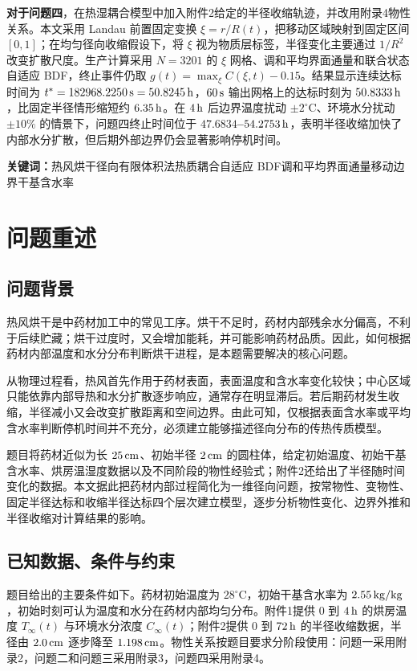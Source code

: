 \documentclass[UTF8,a4paper,12pt]{ctexart}
\numberwithin{equation}{section}
\begin{document}
\textbf{对于问题四}，在热湿耦合模型中加入附件2给定的半径收缩轨迹，并改用附录4物性关系。本文采用 Landau 前置固定变换 $\xi=r/R(t)$，把移动区域映射到固定区间 $[0,1]$；在均匀径向收缩假设下，将 $\xi$ 视为物质层标签，半径变化主要通过 $1/R^2$ 改变扩散尺度。生产计算采用 $N=3201$ 的 $\xi$ 网格、调和平均界面通量和联合状态自适应 BDF，终止事件仍取 $g(t)=\max_\xi C(\xi,t)-0.15$。结果显示连续达标时间为 \textbf{$t^*=182968.2250\rm\,s=50.8245\rm\,h$}，$60\rm\,s$ 输出网格上的达标时刻为 \textbf{$50.8333\rm\,h$}，比固定半径情形缩短约 $6.35\rm\,h$。在 $4\rm\,h$ 后边界温度扰动 $\pm2^\circ\mathrm C$、环境水分扰动 $\pm10\%$ 的情景下，问题四终止时间位于 \textbf{$47.6834$--$54.2753\rm\,h$}，表明半径收缩加快了内部水分扩散，但后期外部边界仍会显著影响停机时间。

\noindent \textbf{关键词：}热风烘干\quad 径向有限体积法\quad 热质耦合\quad 自适应 BDF\quad 调和平均界面通量\quad 移动边界\quad 干基含水率

\section{问题重述}
\subsection{问题背景}
热风烘干是中药材加工中的常见工序。烘干不足时，药材内部残余水分偏高，不利于后续贮藏；烘干过度时，又会增加能耗，并可能影响药材品质。因此，如何根据药材内部温度和水分分布判断烘干进程，是本题需要解决的核心问题。

从物理过程看，热风首先作用于药材表面，表面温度和含水率变化较快；中心区域只能依靠内部导热和水分扩散逐步响应，通常存在明显滞后。若后期药材发生收缩，半径减小又会改变扩散距离和空间边界。由此可知，仅根据表面含水率或平均含水率判断停机时间并不充分，必须建立能够描述径向分布的传热传质模型。

题目将药材近似为长 $25\rm\,cm$、初始半径 $2\rm\,cm$ 的圆柱体，给定初始温度、初始干基含水率、烘房温湿度数据以及不同阶段的物性经验式；附件2还给出了半径随时间变化的数据。本文据此把药材内部过程简化为一维径向问题，按常物性、变物性、固定半径达标和收缩半径达标四个层次建立模型，逐步分析物性变化、边界外推和半径收缩对计算结果的影响。

\subsection{已知数据、条件与约束}
题目给出的主要条件如下。药材初始温度为 $28^\circ\mathrm C$，初始干基含水率为 $2.55\rm\,kg/kg$，初始时刻可认为温度和水分在药材内部均匀分布。附件1提供 $0$ 到 $4\rm\,h$ 的烘房温度 $T_\infty(t)$ 与环境水分浓度 $C_\infty(t)$；附件2提供 $0$ 到 $72\rm\,h$ 的半径收缩数据，半径由 $2.0\rm\,cm$ 逐步降至 $1.198\rm\,cm$。物性关系按题目要求分阶段使用：问题一采用附录2，问题二和问题三采用附录3，问题四采用附录4。
\end{document}
